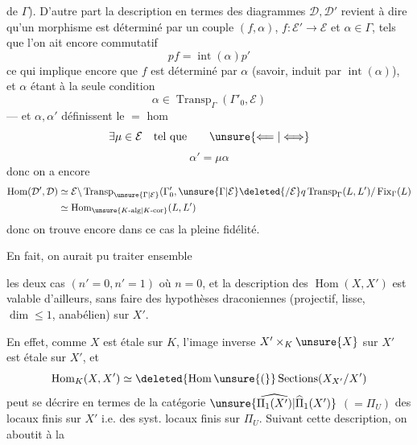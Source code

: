 de $\Gamma$).
D'autre part la description en termes des diagrammes $\mathcal D,\mathcal D'$ revient à dire qu'un morphisme est déterminé par un couple $(f,\alpha)$, $f:\mathcal E'\longrightarrow\mathcal E$ et $\alpha\in\Gamma$, tels que l'on ait encore commutatif
\[
pf=\operatorname{int}(\alpha)p'
\]
ce qui implique encore que $f$ est déterminé par $\alpha$ (savoir, induit par $\operatorname{int}(\alpha)$), et $\alpha$ étant  à la seule condition
\[
\alpha\in\operatorname{Transp}_{\Gamma}(\Gamma'_0,\mathcal E)
\]
--- et $\alpha,\alpha'$ définissent le $=$ hom 
\[
\exists\mu\in\mathcal E\quad\text{tel que}\qquad\unsure{\Longleftarrow|\Longleftrightarrow}
\]
\[
\alpha'=\mu\alpha
\]
donc on a encore
\[
\begin{aligned}
\operatorname{Hom}(\mathcal D',\mathcal D)
&\simeq\mathcal E\backslash\operatorname{Transp}_{\unsure{\Gamma|\mathcal E}}(\Gamma'_0,\unsure{\Gamma|\mathcal E}\deleted{/\mathcal E}q\operatorname{Transp}_{\Gamma}(L,L')/\operatorname{Fix}_{\Gamma}(L)\\
&\simeq\operatorname{Hom}_{\unsure{K\text{-}\mathrm{alg}|K\text{-}\mathrm{cor}}}(L,L')
\end{aligned}
\]
donc on trouve encore dans ce cas la pleine fidélité.

En fait, on aurait pu traiter ensemble

les deux cas $(n'=0,n'=1)$ où $n=0$, et la description des $\operatorname{Hom}(X,X')$  est valable d'ailleurs, sans  faire des hypothèses draconiennes (projectif, lisse, $\dim\leq1$, anabélien) sur $X'$.

En effet, comme $X$ est  étale sur $K$, l'image inverse   $X'\times_K\unsure{X}$ sur $X'$ est  étale sur $X'$, et
\[
\operatorname{Hom}_K(X,X')\simeq\deleted{\operatorname{Hom}\unsure{(}}\operatorname{Sections}(X_{X'}/X')
\]
peut se décrire en termes de la catégorie $\unsure{\widehat{\Pi_1(X')}|\widehat{\Pi}_1(X')}$ $(=\Pi_U)$ des  locaux finis sur $X'$ i.e. des syst. locaux finis sur $\Pi_U$.
Suivant cette description, on aboutit à la

